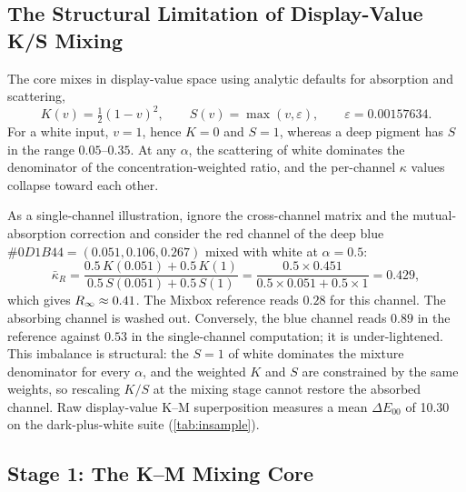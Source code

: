 \subsection{The Structural Limitation of Display-Value K/S Mixing}
\label{sec:defect}

The core mixes in display-value space using analytic defaults for absorption and scattering,
\begin{equation}
K(v)=\tfrac12(1-v)^{2},\qquad S(v)=\max(v,\varepsilon),\qquad \varepsilon=0.00157634.
\label{eq:ks-default}
\end{equation}
For a white input, $v=1$, hence $K=0$ and $S=1$, whereas a deep pigment has $S$ in the range $0.05$--$0.35$. At any $\alpha$, the scattering of white dominates the denominator of the concentration-weighted ratio, and the per-channel $\kappa$ values collapse toward each other.

As a single-channel illustration, ignore the cross-channel matrix and the mutual-absorption correction and consider the red channel of the deep blue $\#0D1B44=(0.051,0.106,0.267)$ mixed with white at $\alpha=0.5$:
\begin{equation}
\bar{\kappa}_{R}=
\frac{0.5\,K(0.051)+0.5\,K(1)}{0.5\,S(0.051)+0.5\,S(1)}
=\frac{0.5\times0.451}{0.5\times0.051+0.5\times1}=0.429,
\label{eq:defect}
\end{equation}
which gives $R_{\infty}\approx0.41$. The Mixbox reference reads $0.28$ for this channel. The absorbing channel is washed out. Conversely, the blue channel reads $0.89$ in the reference against $0.53$ in the single-channel computation; it is under-lightened. This imbalance is structural: the $S=1$ of white dominates the mixture denominator for every $\alpha$, and the weighted $K$ and $S$ are constrained by the same weights, so rescaling $K/S$ at the mixing stage cannot restore the absorbed channel. Raw display-value K--M superposition measures a mean $\Delta E_{00}$ of 10.30 on the dark-plus-white suite (\cref{tab:insample}).

\subsection{Stage 1: The K--M Mixing Core}
\label{sec:core}


